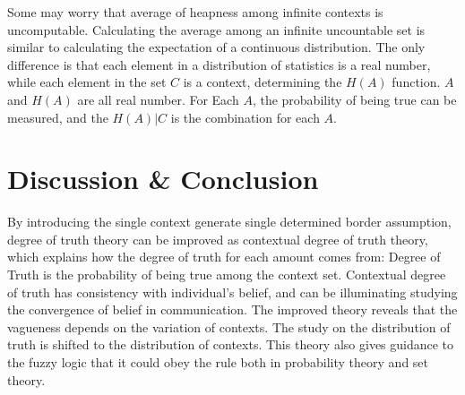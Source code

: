 \documentclass{article}
\begin{document}
Some may worry that average of heapness among infinite contexts is uncomputable. Calculating the average among an infinite uncountable set is similar to calculating the expectation of a continuous distribution. The only difference is that each element in a distribution of statistics is a real number, while each element in the set $C$ is a context, determining the $H(A)$ function. $A$ and $H(A)$ are all real number. For Each $A$, the probability of being true can be measured, and the $H(A)|C$ is the combination for each $A$. 

\section{Discussion \& Conclusion}

By introducing the single context generate single determined border assumption, degree of truth theory can be improved as contextual degree of truth theory, which explains how the degree of truth for each amount comes from: Degree of Truth is the probability of being true among the context set. Contextual degree of truth has consistency with individual's belief, and can be illuminating studying the convergence of belief in communication. The improved theory reveals that the vagueness depends on the variation of contexts. The study on the distribution of truth is shifted to the distribution of contexts. This theory also gives guidance to the fuzzy logic that it could obey the rule both in probability theory and set theory.
\end{document}
